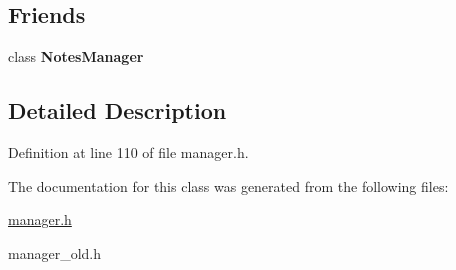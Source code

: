 \subsection*{Friends}
\begin{DoxyCompactItemize}
\item 
\mbox{\label{class_notes_manager_1_1_iterator_adba5a62f2cb809ee2e85400572ce3ad4}} 
class {\bfseries Notes\+Manager}
\end{DoxyCompactItemize}


\subsection{Detailed Description}


Definition at line 110 of file manager.\+h.



The documentation for this class was generated from the following files\+:\begin{DoxyCompactItemize}
\item 
\hyperlink{manager_8h}{manager.\+h}\item 
manager\+\_\+old.\+h\end{DoxyCompactItemize}

